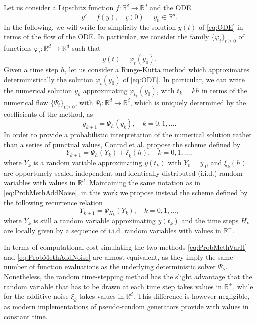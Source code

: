 \documentclass{siamart1116}
\numberwithin{theorem}{section}
\renewcommand{\phi}{\varphi}
\newcommand{\R}{\mathbb{R}}
\begin{document}
Let us consider a Lipschitz function $f\colon\R^d\to\R^d$ and the ODE
\begin{equation}\label{eq:ODE}
	y' = f(y), \quad y(0) = y_0 \in \R^d.
\end{equation}
In the following, we will write for simplicity the solution $y(t)$ of \eqref{eq:ODE} in terms of the flow of the ODE. In particular, we consider the family  $\{\phi_t\}_{t \geq 0}$ of functions $\phi_t\colon\R^d\to\R^d$ such that 
\begin{equation}
	y(t) = \phi_t(y_0).
\end{equation}
Given a time step $h$, let us consider a Runge-Kutta method which approximates deterministically the solution $\phi_t(y_0)$ of \eqref{eq:ODE}. In particular, we can write the numerical solution $y_k$ approximating $\phi_{t_k}(y_0)$, with $t_k = kh$ in terms of the numerical flow $\{\Psi_t\}_{t \geq 0}$, with $\Psi_t\colon\R^d\to\R^d$, which is uniquely determined by the coefficients of the method, as
\begin{equation}
	y_{k+1} = \Psi_h(y_k), \quad k = 0, 1, \ldots.
\end{equation}
In order to provide a probabilistic interpretation of the numerical solution rather than a series of punctual values, Conrad et al. propose the scheme defined by
\begin{equation}\label{eq:ProbMethAddNoise}
	Y_{k+1} = \Psi_h(Y_{k}) + \xi_k(h), \quad k = 0, 1, \ldots,
\end{equation}
where $Y_k$ is a random variable approximating $y(t_k)$ with $Y_0 = y_0$, and $\xi_k(h)$ are opportunely scaled independent and identically distributed (i.i.d.) random variables with values in $\R^d$. Maintaining the same notation as in \eqref{eq:ProbMethAddNoise}, in this work we propose instead the scheme defined by the following recurrence relation
\begin{equation}\label{eq:ProbMethVarH}
	Y_{k+1} = \Psi_{H_k}(Y_k), \quad k = 0, 1, \ldots,
\end{equation}
where $Y_k$ is still a random variable approximating $y(t_k)$ and the time steps $H_k$ are locally given by a sequence  of i.i.d. random variables with values in $\R^+$.
\begin{remark} In terms of computational cost simulating the two methods \eqref{eq:ProbMethVarH} and \eqref{eq:ProbMethAddNoise} are almost equivalent, as they imply the same number of function evaluations as the underlying deterministic solver $\Psi_h$. Nonetheless, the random time-stepping method has the slight advantage that the random variable that has to be drawn at each time step takes values in $\R^+$, while for the additive noise $\xi_k$ takes values in $\R^d$. This difference is however negligible, as modern implementations of pseudo-random generators provide with values in constant time.
\end{remark}
\end{document}
